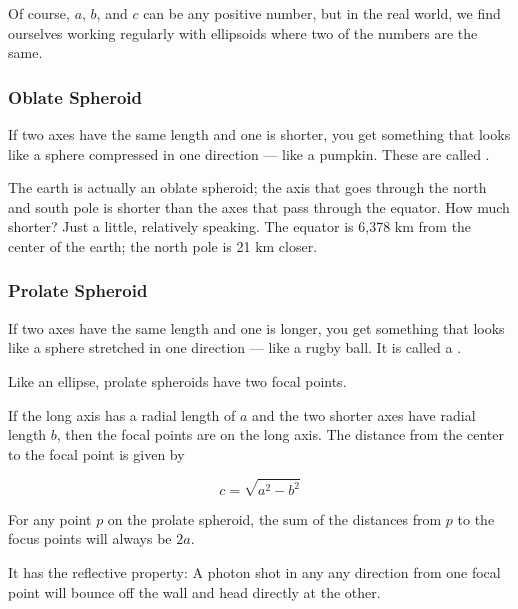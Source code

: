 Of course, $a$, $b$, and $c$ can be any positive number, but in the
real world, we find ourselves working regularly with ellipsoids where two
of the numbers are the same.

\subsubsection{Oblate Spheroid}

If two axes have the same length and one is shorter, you get something
that looks like a sphere compressed in one direction --- like a
pumpkin. These are called .

The earth is actually an oblate spheroid; the axis that goes through
the north and south pole is shorter than the axes that pass through
the equator. How much shorter? Just a little, relatively speaking. The equator is 6,378 km
from the center of the earth; the north pole is 21 km closer.

\subsubsection{Prolate Spheroid}

If two axes have the same length and one is longer, you get something
that looks like a sphere stretched in one direction --- like a rugby
ball. It is called a .

Like an ellipse, prolate spheroids have two focal points.

\begin{mdframed}[style=important, frametitle={Focal Points of a Prolate Spheroid}]

  If the long axis has a radial length of $a$ and the two shorter axes
  have radial length $b$, then the focal points are on the long axis. The distance from the center to the focal point is given by

  $$c = \sqrt{a^2 - b^2}$$

  For any point $p$ on the prolate spheroid, the sum of the distances
  from $p$ to the focus points will always be $2a$.

  It has the reflective property: A photon shot in any any direction
  from one focal point will bounce off the wall and head directly at the other.
  
\end{mdframed}

